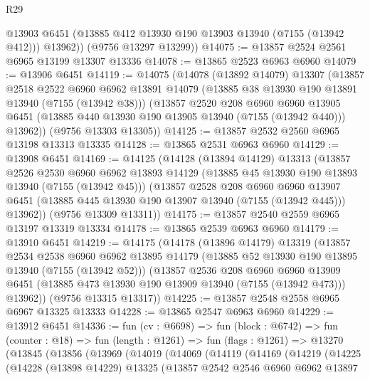 \begin{lexlean}{R29}
\begin{coremodule}
          @13903
          @6451
          (@13885 @412 @13930 @190 @13903 @13940 (@7155 (@13942 @412)))
          @13962))
      (@9756 @13297 @13299))
@14075 := @13857 @2524 @2561 @6965 @13199 @13307 @13336
@14078 := @13865 @2523 @6963 @6960
@14079 := @13906 @6451
@14119 := @14075
    (@14078
      (@13892 @14079)
      @13307
      (@13857
        @2518
        @2522
        @6960
        @6962
        @13891
        @14079
        (@13885 @38 @13930 @190 @13891 @13940 (@7155 (@13942 @38)))
        (@13857
          @2520
          @208
          @6960
          @6960
          @13905
          @6451
          (@13885 @440 @13930 @190 @13905 @13940 (@7155 (@13942 @440)))
          @13962))
      (@9756 @13303 @13305))
@14125 := @13857 @2532 @2560 @6965 @13198 @13313 @13335
@14128 := @13865 @2531 @6963 @6960
@14129 := @13908 @6451
@14169 := @14125
    (@14128
      (@13894 @14129)
      @13313
      (@13857
        @2526
        @2530
        @6960
        @6962
        @13893
        @14129
        (@13885 @45 @13930 @190 @13893 @13940 (@7155 (@13942 @45)))
        (@13857
          @2528
          @208
          @6960
          @6960
          @13907
          @6451
          (@13885 @445 @13930 @190 @13907 @13940 (@7155 (@13942 @445)))
          @13962))
      (@9756 @13309 @13311))
@14175 := @13857 @2540 @2559 @6965 @13197 @13319 @13334
@14178 := @13865 @2539 @6963 @6960
@14179 := @13910 @6451
@14219 := @14175
    (@14178
      (@13896 @14179)
      @13319
      (@13857
        @2534
        @2538
        @6960
        @6962
        @13895
        @14179
        (@13885 @52 @13930 @190 @13895 @13940 (@7155 (@13942 @52)))
        (@13857
          @2536
          @208
          @6960
          @6960
          @13909
          @6451
          (@13885 @473 @13930 @190 @13909 @13940 (@7155 (@13942 @473)))
          @13962))
      (@9756 @13315 @13317))
@14225 := @13857 @2548 @2558 @6965 @6967 @13325 @13333
@14228 := @13865 @2547 @6963 @6960
@14229 := @13912 @6451
@14336 := fun (cv : @6698) =>
  fun (block : @6742) =>
  fun (counter : @18) =>
  fun (length : @1261) =>
  fun (flags : @1261) =>
  @13270
    (@13845
      (@13856
        (@13969
          (@14019
            (@14069
              (@14119
                (@14169
                  (@14219
                    (@14225
                      (@14228
                        (@13898 @14229)
                        @13325
                        (@13857
                          @2542
                          @2546
                          @6960
                          @6962
                          @13897

\end{coremodule}
\end{lexlean}
